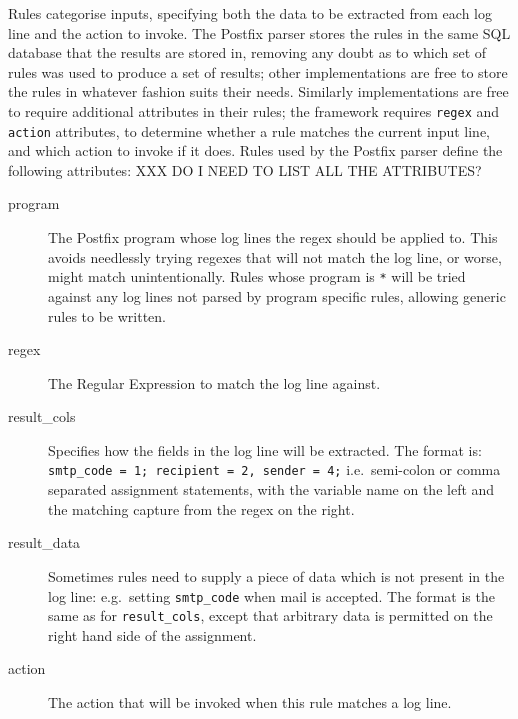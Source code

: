 \documentclass[draft]{svmult}
\newcommand{\tab}[0]{%
    \hspace*{2em}%
}
\begin{document}
\label{Rules}

Rules categorise inputs, specifying both the data to be extracted from each
log line and the action to invoke.  The Postfix parser stores the rules in
the same SQL database that the results are stored in, removing any doubt as
to which set of rules was used to produce a set of results; other
implementations are free to store the rules in whatever fashion suits their
needs.  Similarly implementations are free to require additional attributes
in their rules; the framework requires \texttt{regex} and \texttt{action}
attributes, to determine whether a rule matches the current input line, and
which action to invoke if it does.  Rules used by the Postfix parser
define the following attributes: XXX DO I NEED TO LIST ALL THE
ATTRIBUTES\@?

\begin{description}

    \item [program] The Postfix program whose log lines the regex should be
        applied to.  This avoids needlessly trying regexes that will not
        match the log line, or worse, might match unintentionally.  Rules
        whose program is \texttt{*} will be tried against any log lines not
        parsed by program specific rules, allowing generic rules to be
        written.

    \item [regex] The Regular Expression to match the log line against.

    \item [result\_cols] Specifies how the fields in the log line will be
        extracted.  The format is:
        \tab{} \texttt{smtp\_code = 1; recipient = 2, sender = 4;} \newline
        i.e.\ semi-colon or comma separated assignment statements, with the
        variable name on the left and the matching capture from the regex
        on the right.

    \item [result\_data] Sometimes rules need to supply a piece of data
        which is not present in the log line: e.g.\ setting
        \texttt{smtp\_code} when mail is accepted.  The format is the same
        as for \texttt{result\_cols}, except that arbitrary data is
        permitted on the right hand side of the assignment.

    \item [action] The action that will be invoked when this rule matches a
        log line.


\end{description}
\end{document}

